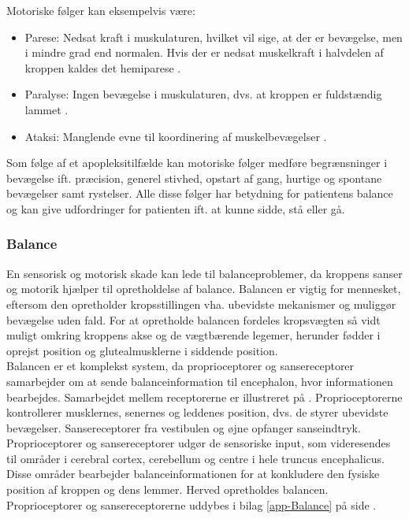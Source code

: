 \noindent Motoriske følger kan eksempelvis være:
\begin{itemize}
  \item Parese: Nedsat kraft i muskulaturen, hvilket vil sige, at der er bevægelse, men i mindre grad end normalen. Hvis der er nedsat muskelkraft i halvdelen af kroppen kaldes det hemiparese \cite{Kruuse2015a}.
  \item Paralyse: Ingen bevægelse i muskulaturen, dvs. at kroppen er fuldstændig lammet \cite{Vistrup2015}.
  \item Ataksi: Manglende evne til koordinering af muskelbevægelser \cite{Redaktionen2015a}.
\end{itemize}
Som følge af et apopleksitilfælde kan motoriske følger medføre begrænsninger i bevægelse ift. præcision, generel stivhed, opstart af gang, hurtige og spontane bevægelser samt rystelser. Alle disse følger har betydning for patientens balance og kan give udfordringer for patienten ift. at kunne sidde, stå eller gå. \cite{Kruuse2015a,DSfA2009}

\subsubsection{Balance}\label{BalanceAfsnit}
En sensorisk og motorisk skade kan lede til balanceproblemer, da kroppens sanser og motorik hjælper til opretholdelse af balance. Balancen er vigtig for mennesket, eftersom den opretholder kropsstillingen vha. ubevidste mekanismer og muliggør bevægelse uden fald. For at opretholde balancen fordeles kropsvægten så vidt muligt omkring kroppens akse og de vægtbærende legemer, herunder fødder i oprejst position og glutealmusklerne i siddende position. \cite{Nichols1997} \\
Balancen er et komplekst system, da proprioceptorer og sansereceptorer samarbejder om at sende balanceinformation til encephalon, hvor informationen bearbejdes. Samarbejdet mellem receptorerne er illustreret på . Proprioceptorerne kontrollerer musklernes, senernes og leddenes position, dvs. de styrer ubevidste bevægelser. \cite{Martini2012} Sansereceptorer fra vestibulen og øjne opfanger sanseindtryk. Proprioceptorer og sansereceptorer udgør de sensoriske input, som videresendes til områder i cerebral cortex, cerebellum og centre i hele truncus encephalicus. Disse områder bearbejder balanceinformationen for at konkludere den fysiske position af kroppen og dens lemmer. Herved opretholdes balancen. \cite{Karnath2003,Martini2012} Proprioceptorer og sansereceptorerne uddybes i bilag \ref{app-Balance} på side \pageref{app-Balance}.

